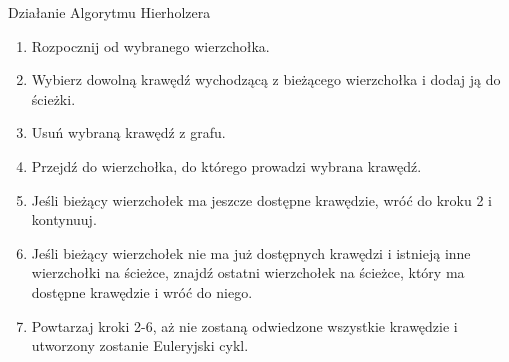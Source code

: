 \documentclass[polish,envcountsect,10pt]{beamer}
\begin{document}
\begin{frame}{Działanie Algorytmu Hierholzera}
    \begin{enumerate}
        \item Rozpocznij od wybranego wierzchołka.
        \item Wybierz dowolną krawędź wychodzącą z bieżącego wierzchołka i dodaj ją do ścieżki.
        \item Usuń wybraną krawędź z grafu.
        \item Przejdź do wierzchołka, do którego prowadzi wybrana krawędź.
        \item Jeśli bieżący wierzchołek ma jeszcze dostępne krawędzie, wróć do kroku 2 i kontynuuj.
        \item Jeśli bieżący wierzchołek nie ma już dostępnych krawędzi i istnieją inne wierzchołki na ścieżce, znajdź ostatni wierzchołek na ścieżce, który ma dostępne krawędzie i wróć do niego.
        \item Powtarzaj kroki 2-6, aż nie zostaną odwiedzone wszystkie krawędzie i utworzony zostanie Euleryjski cykl.
    \end{enumerate}
\end{frame}
\end{document}
